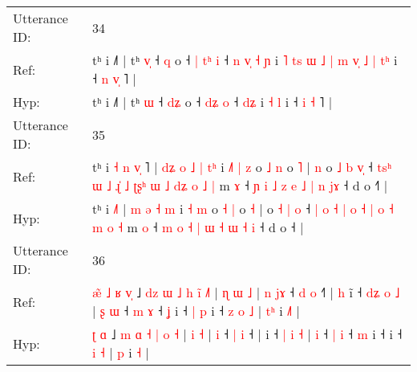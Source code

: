 \documentclass[10pt]{article}
\DeclareRobustCommand{\hl}[1]{{\textcolor{red}{#1}}}
\begin{document}
\begin{longtable}{ll}
 \\
\midrule
Utterance ID: & 34 \\
Ref: & tʰ i ˩˥ | tʰ \hl{v}\hl{̩} ˧ \hl{}\hl{q} o ˧\hl{ }\hl{|} \hl{t}\hl{ʰ} \hl{i} ˧\hl{ }\hl{n}\hl{ }\hl{v}\hl{̩} \hl{˧}\hl{ }\hl{ɲ} i\hl{ }\hl{˥}\hl{ }\hl{t}\hl{s}\hl{ }\hl{ɯ}\hl{ }\hl{˩}\hl{ }\hl{|}\hl{ }\hl{m}\hl{ }\hl{v}\hl{̩}\hl{ }\hl{˩} \hl{|} \hl{t}\hl{ʰ} i ˧ \hl{n} \hl{v}\hl{̩} ˥ |
 \\
Hyp: & tʰ i ˩˥ | tʰ \hl{}\hl{ɯ} ˧ \hl{d}\hl{ʑ} o ˧\hl{}\hl{} \hl{d}\hl{ʑ} \hl{o} ˧\hl{}\hl{}\hl{}\hl{}\hl{} \hl{}\hl{d}\hl{ʑ} i\hl{}\hl{}\hl{}\hl{}\hl{}\hl{}\hl{}\hl{}\hl{}\hl{}\hl{}\hl{}\hl{}\hl{}\hl{}\hl{}\hl{}\hl{} \hl{˧} \hl{}\hl{l} i ˧ \hl{i} \hl{}\hl{˧} ˥ |
 \\
\midrule
Utterance ID: & 35 \\
Ref: & tʰ i\hl{ }\hl{˧}\hl{ }\hl{n} \hl{v}\hl{̩}\hl{ }˥ |\hl{ }\hl{d}\hl{ʑ} \hl{o} \hl{˩} \hl{|} \hl{t}\hl{ʰ} i\hl{ }\hl{˩}\hl{˥} \hl{|} \hl{z} o \hl{˩} \hl{n} o \hl{˥} |\hl{ }\hl{n} o \hl{˩} \hl{b} \hl{v}\hl{̩} ˧ \hl{t}\hl{s}\hl{ʰ} \hl{ɯ} \hl{˩} \hl{ɻ}\hl{̍} \hl{˩} \hl{ʈ}\hl{ʂ}\hl{ʰ} \hl{ɯ} \hl{˩} \hl{d}\hl{ʑ} \hl{o} \hl{˩} \hl{|} m \hl{ɤ} ˧ \hl{ɲ} \hl{i} \hl{˩} \hl{z} \hl{e} \hl{˩} \hl{|} \hl{n} \hl{j}\hl{ɤ} ˧ d o ˧\hl{˥} |
 \\
Hyp: & tʰ i\hl{}\hl{}\hl{}\hl{} \hl{}\hl{}\hl{˩}˥ |\hl{}\hl{}\hl{} \hl{m} \hl{ə} \hl{˧} \hl{}\hl{m} i\hl{}\hl{}\hl{} \hl{˧} \hl{m} o \hl{˧} \hl{|} o \hl{˧} |\hl{}\hl{} o \hl{˧} \hl{|} \hl{}\hl{o} ˧ \hl{}\hl{}\hl{|} \hl{o} \hl{˧} \hl{}\hl{|} \hl{o} \hl{}\hl{}\hl{˧} \hl{|} \hl{o} \hl{}\hl{˧} \hl{m} \hl{o} \hl{˧} m \hl{o} ˧ \hl{m} \hl{o} \hl{˧} \hl{|} \hl{ɯ} \hl{˧} \hl{ɯ} \hl{˧} \hl{}\hl{i} ˧ d o ˧\hl{} |
 \\
\midrule
Utterance ID: & 36 \\
Ref: & \hl{æ}\hl{̃}\hl{ }\hl{˩}\hl{ }\hl{ʁ} \hl{v}\hl{̩} ˩ \hl{d}\hl{z} \hl{ɯ} \hl{˩} \hl{h} \hl{i}\hl{̃} \hl{˩}\hl{˥} |\hl{ }\hl{ɳ} \hl{ɯ} \hl{˩} |\hl{ }\hl{n} \hl{j}\hl{ɤ} ˧ \hl{d} \hl{o} ˧\hl{˥} |\hl{ }\hl{h} i\hl{̃} ˧ \hl{d}\hl{ʑ} \hl{o} \hl{˩} |\hl{ }\hl{ʂ} \hl{ɯ} ˧ \hl{m} \hl{ɤ} ˧ \hl{ʝ} i ˧\hl{ }\hl{|}\hl{ }\hl{p} i ˧\hl{ }\hl{z} \hl{o} \hl{˩} | \hl{t}\hl{ʰ} i \hl{˩}\hl{˥} |
 \\
Hyp: & \hl{}\hl{}\hl{}\hl{}\hl{}\hl{ʈ} \hl{}\hl{ɑ} ˩ \hl{}\hl{m} \hl{ɑ} \hl{˧} \hl{|} \hl{}\hl{o} \hl{}\hl{˧} |\hl{}\hl{} \hl{i} \hl{˧} |\hl{}\hl{} \hl{}\hl{i} ˧ \hl{|} \hl{i} ˧\hl{} |\hl{}\hl{} i\hl{} ˧ \hl{}\hl{|} \hl{i} \hl{˧} |\hl{}\hl{} \hl{i} ˧ \hl{|} \hl{i} ˧ \hl{m} i ˧\hl{}\hl{}\hl{}\hl{} i ˧\hl{}\hl{} \hl{i} \hl{˧} | \hl{}\hl{p} i \hl{}\hl{˧} |

\end{longtable}
\end{document}
